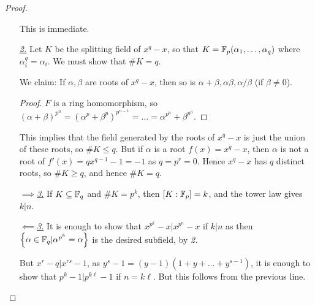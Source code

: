 \documentclass[10pt,a4paper]{article}
\begin{document}
\begin{proof}
\item
\begin{itemize}
\item[\imp{2}{1}] This is immediate.
\item[\underline{\textit{2.}}] Let $K$ be the splitting field of $x^q-x$, so that $K = \mathbb{F}_p(\alpha_1, \ldots, \alpha_q)$ where $\alpha_i^q = \alpha_i$. We must show that $\#K = q$.

We claim: If $\alpha, \beta$ are roots of $x^q - x$, then so is $\alpha+\beta, \alpha\beta, \alpha/\beta$ (if $\beta\neq 0$).
\begin{proof}
$F$ is a ring homomorphism, so $(\alpha+\beta)^{p^n} = (\alpha^p + \beta^p)^{p^{n-1}} = \ldots = \alpha^{p^n} + \beta^{p^n}$.
\end{proof}
This implies that the field generated by the roots of $x^q-x$ is just the union of these roots, so $\#K \leq q$. But if $\alpha$ is a root $f(x) = x^q-x$, then $\alpha$ is not a root of $f'(x) = qx^{q-1} - 1 = -1$ as $q = p^r = 0$. Hence $x^q-x$ has $q$ distinct roots, so $\#K \geq q$, and hence $\#K = q$.
\item[\underline{$\implies$\textit{3.}}] If $K\subseteq \mathbb{F}_q$ and $\#K=p^k$, then $[K:\mathbb{F}_p] = k$, and the tower law gives $k|n$.
\item[\underline{$\impliedby$\textit{3.}}] It is enough to show that $x^{p^k}-x | x^{p^n}-x$ if $k|n$ as then $\left\{\alpha\in\mathbb{F}_q | \alpha^{p^k} = \alpha\right\}$ is the desired subfield, by \textit{2.}

But $x^r-q | x^{rs} - 1$, as $y^s - 1 = (y-1)(1+ y + \ldots + y^{s-1})$, it is enough to show that $p^k-1 | p^{k\ell}-1$ if $n=k\ell$. But this follows from the previous line.
\end{itemize}
\end{proof}
\end{document}
